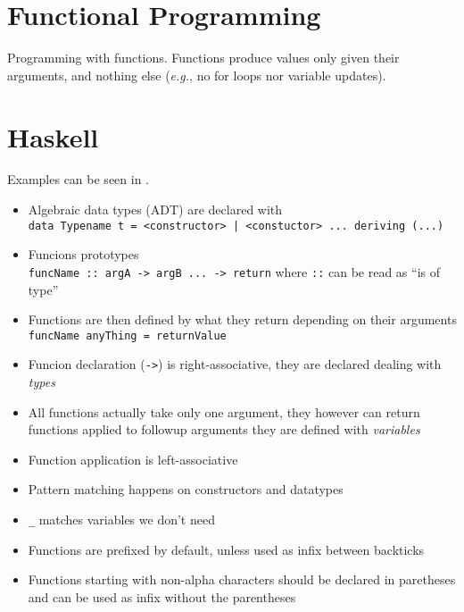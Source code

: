 \documentclass[a4paper]{article}
\title{\theTitle}
\author{\theAuthor}
\date{23--24 January 20133}
\newcommand{\latinlocution}[1]{\textit{#1}}
\newcommand{\eg}{\latinlocution{e.g.}}
\begin{document}
\maketitle

\section{Functional Programming}

Programming with functions. Functions produce values only given their arguments,
and nothing else (\eg, no for loops nor variable updates).

\section{Haskell}

Examples can be seen in .

\begin{itemize}
  \item Algebraic data types (ADT) are declared with\\
    \verb_data Typename t = <constructor> | <constuctor> ... deriving (...)_
  \item Funcions prototypes \\
    \verb_funcName :: argA -> argB ... -> return_ where \verb_::_ can be read as
    ``is of type''
  \item Functions are then defined by what they return depending on their
    arguments
    \verb_funcName anyThing = returnValue_
  \item Funcion declaration (\verb_->_) is right-associative, they are declared dealing with \emph{types}

  \item All functions actually take only one argument, they however can return
    functions applied to followup arguments they are defined with
    \emph{variables}
  \item Function application is left-associative
  \item Pattern matching happens on constructors and datatypes
  \item \verb#_# matches variables we don't need
  \item Functions are prefixed by default, unless used as infix between
    backticks
  \item Functions starting with non-alpha characters should be declared in
    paretheses and can be used as infix without the parentheses
\end{itemize}
\end{document}

